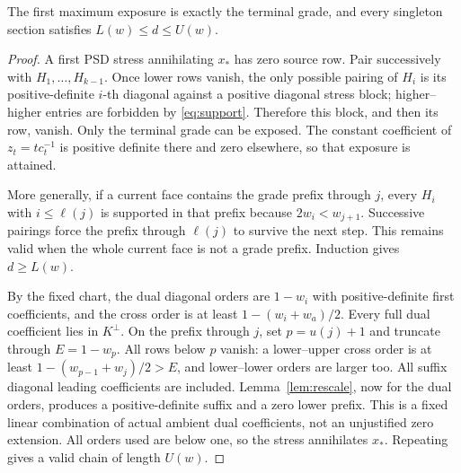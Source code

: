 \begin{proposition}\label{prop:sandwich}
The first maximum exposure is exactly the terminal grade, and every singleton section satisfies $L(w)\le d\le U(w)$.
\end{proposition}
\begin{proof}
A first PSD stress annihilating $x_*$ has zero source row. Pair successively with $H_1,\ldots,H_{k-1}$. Once lower rows vanish, the only possible pairing of $H_i$ is its positive-definite $i$-th diagonal against a positive diagonal stress block; higher--higher entries are forbidden by \eqref{eq:support}. Therefore this block, and then its row, vanish. Only the terminal grade can be exposed. The constant coefficient of $z_t=t c_t^{-1}$ is positive definite there and zero elsewhere, so that exposure is attained.

More generally, if a current face contains the grade prefix through $j$, every $H_i$ with $i\le\ell(j)$ is supported in that prefix because $2w_i<w_{j+1}$. Successive pairings force the prefix through $\ell(j)$ to survive the next step. This remains valid when the whole current face is not a grade prefix. Induction gives $d\ge L(w)$.

By the fixed chart, the dual diagonal orders are $1-w_i$ with positive-definite first coefficients, and the cross order is at least $1-(w_i+w_a)/2$. Every full dual coefficient lies in $K^\perp$. On the prefix through $j$, set $p=u(j)+1$ and truncate through $E=1-w_p$. All rows below $p$ vanish: a lower--upper cross order is at least $1-(w_{p-1}+w_j)/2>E$, and lower--lower orders are larger too. All suffix diagonal leading coefficients are included. Lemma~\ref{lem:rescale}, now for the dual orders, produces a positive-definite suffix and a zero lower prefix. This is a fixed linear combination of actual ambient dual coefficients, not an unjustified zero extension. All orders used are below one, so the stress annihilates $x_*$. Repeating gives a valid chain of length $U(w)$.
\end{proof}

